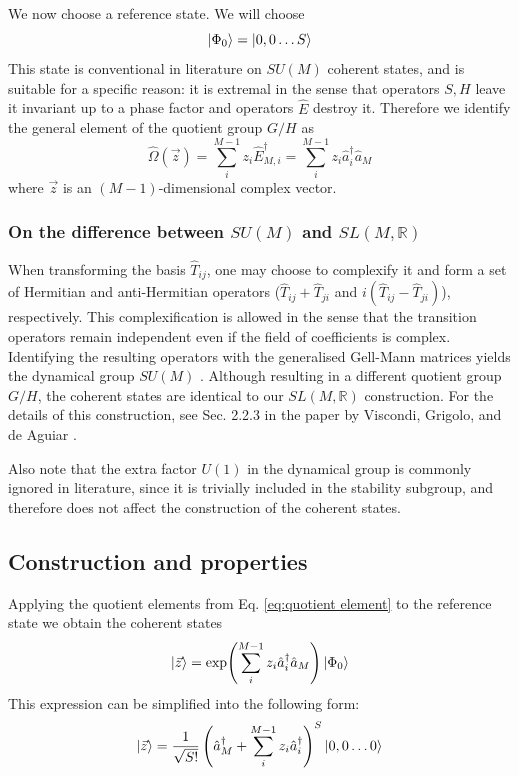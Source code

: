 \documentclass[12pt]{article}
\begin{document}
	We now choose a reference state. We will choose
	\begin{equation}
	\ket{\Phi_0}=\ket{0,0\dots S}
	\end{equation}
	This state is conventional in literature on $SU(M)$ coherent states, and is suitable for a specific reason: it is extremal in the sense that operators $S, H$ leave it invariant up to a phase factor and operators $\hat{E}$ destroy it. Therefore we identify the general element of the quotient group $G/H$ as
	\begin{equation} \label{eq:quotient element}
	\hat{\Omega}(\vec{z})=\sum_i^{M-1}z_i\hat{E}^\dagger_{M,i}=\sum_i^{M-1}z_i\hat{a}^\dagger_i\hat{a}_M
	\end{equation}
	where $\vec{z}$ is an $(M-1)$-dimensional complex vector.
	
	\subsubsection{On the difference between $SU(M)$ and $SL(M,\mathbb{R})$}
	When transforming the basis $\hat{T}_{ij}$, one may choose to complexify it and form a set of Hermitian and anti-Hermitian operators ($\hat{T}_{ij}+\hat{T}_{ji}$ and $i(\hat{T}_{ij}-\hat{T}_{ji})$), respectively. This complexification is allowed in the sense that the transition operators remain independent even if the field of coefficients is complex. Identifying the resulting operators with the generalised Gell-Mann matrices yields the dynamical group $SU(M)$ \cite{gellmann}. Although resulting in a different quotient group $G/H$, the coherent states are identical to our $SL(M,\mathbb{R})$ construction. For the details of this construction, see Sec. 2.2.3 in the paper by Viscondi, Grigolo, and de Aguiar \cite{Aguiar}.
	
	Also note that the extra factor $U(1)$ in the dynamical group is commonly ignored in literature, since it is trivially included in the stability subgroup, and therefore does not affect the construction of the coherent states.
	
	
	\subsection{Construction and properties}
	Applying the quotient elements from Eq. \ref{eq:quotient element} to the reference state we obtain the coherent states
	\begin{equation}\label{eq:exponential form}
	\ket{\vec{z}}=\exp(\sum_i^{M-1}z_i\hat{a}^\dagger_i\hat{a}_M)\ket{\Phi_0}
	\end{equation}
	This expression can be simplified \cite{buonsante} into the following form:
	\begin{equation}
	\ket{\vec{z}}=\frac{1}{\sqrt{S!}}\left(\hat{a}^\dagger_M+\sum_i^{M-1}z_i\hat{a}^\dagger_i\right)^S\ket{0,0\dots 0}
	\end{equation}
	
\end{document}

